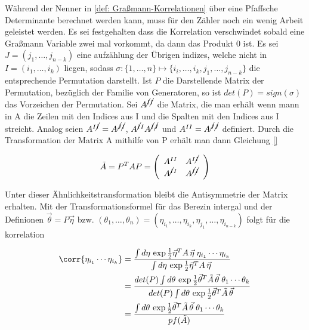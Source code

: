 \noindent Während der Nenner in \eqref{def: Graßmann-Korrelationen} über eine Pfaffsche Determinante berechnet werden kann, muss für den Zähler noch ein wenig Arbeit geleistet werden. Es sei festgehalten dass die Korrelation verschwindet sobald eine Graßmann Variable zwei mal vorkommt, da dann das Produkt 0 ist. 
Es sei $J = (j_1, \dots, j_{n-k})$ eine aufzählung der Übrigen indizes, welche nicht in $I = (i_1,\dots, i_k)$ liegen, sodass $\sigma: \{1,\dots, n\} \mapsto \{i_i, \dots, i_k, j_1, \dots, j_{n-k}\}$ die entsprechende Permutation darstellt. Ist $P$ die Darstellende Matrix der Permutation, bezüglich der Familie von Generatoren, so ist $det(P) = sign(\sigma)$ das Vorzeichen der Permutation. Sei $A^{\cancel{I}\cancel{I}}$ die Matrix, die man erhält wenn mann in A die Zeilen mit den Indices aus I und die Spalten mit den Indices aus I streicht. Analog seien $A^{I\cancel{I}} = A^{\cancel{J}\cancel{I}}$,  $A^{\cancel{I}I}A^{\cancel{I}\cancel{J}}$ und  $A^{II} = A^{\cancel{J}\cancel{J}}$ definiert. Durch die Transformation der Matrix A mithilfe von P erhält man dann Gleichung \eqref{}

\begin{equation}
   \tilde A =  P^T A P =
        \left( \begin{array}{cc}
        A^{II}          & A^{I \cancel{I}} \\
        A^{\cancel{I} I} & A^{\cancel{I} \cancel{I}}
        \end{array} \right)
\end{equation}

\noindent Unter dieser Ähnlichkeitstransformation bleibt die Antisymmetrie der Matrix erhalten. Mit der Transformationsformel für das Berezin intergal und der Definionen $ \vec{\theta} = P \vec{\eta} $ bzw. $ (\theta_1, \dots, \theta_n) =  (\eta_{i_1}, \dots ,\eta_{i_k}, \eta_{j_1}, \dots, \eta_{i_{n-k}}) $ folgt für die korrelation 

\begin{align}
\corr{\eta_{i_1} \cdots \eta_{i_k}} 
    & = \frac{\int d\eta\, \exp{ \frac{1}{2}\vec{\eta}^T A\, \vec{\eta}\;}  \eta_{i_1}\cdots\eta_{i_k}}{\int d\eta \,\exp{\frac{1}{2} \vec{\eta}^T A\, \vec{\eta}\;}} \nonumber \\
    & =  \frac{ det(P) \int d\theta\, \exp{ \frac{1}{2} \vec{\theta}^T \tilde A\, \vec{\theta}\;}  \theta_{1}\cdots\theta_k}{det(P) \int d\theta \,\exp{ \frac{1}{2} \vec{\theta}^T \tilde A\, \vec{\theta}\;}} \nonumber \\
    & = \frac{ \int d\theta\, \exp{ \frac{1}{2} \vec{\theta}^T \tilde A\, \vec{\theta}\;}  \theta_{1}\cdots\theta_k}{pf(\tilde A)}
\end{align}

